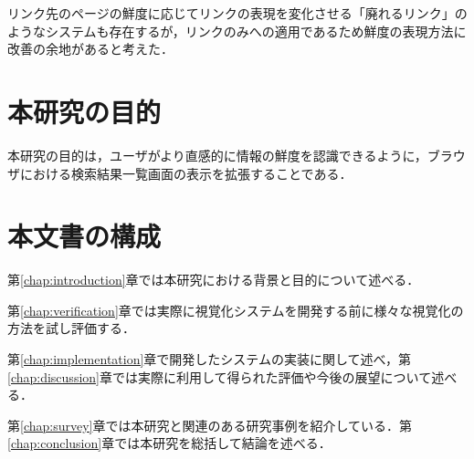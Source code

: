 リンク先のページの鮮度に応じてリンクの表現を変化させる「廃れるリンク」\cite{dyinglink}のようなシステムも存在するが，リンクのみへの適用であるため鮮度の表現方法に改善の余地があると考えた．

\section{本研究の目的}

本研究の目的は，ユーザがより直感的に情報の鮮度を認識できるように，ブラウザにおける検索結果一覧画面の表示を拡張することである．

\section{本文書の構成}

第\ref{chap:introduction}章では本研究における背景と目的について述べる．

第\ref{chap:verification}章では実際に視覚化システムを開発する前に様々な視覚化の方法を試し評価する．

第\ref{chap:implementation}章で開発したシステムの実装に関して述べ，第\ref{chap:discussion}章では実際に利用して得られた評価や今後の展望について述べる．

第\ref{chap:survey}章では本研究と関連のある研究事例を紹介している．第\ref{chap:conclusion}章では本研究を総括して結論を述べる．
